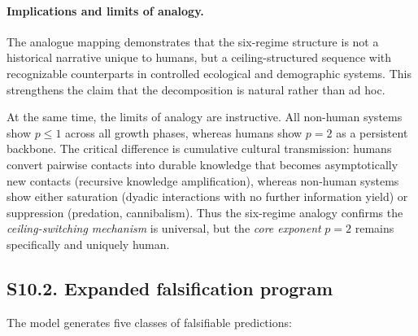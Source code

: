 \documentclass[11pt]{article}
\begin{document}
\paragraph{Implications and limits of analogy.}

The analogue mapping demonstrates that the six-regime structure is not a historical narrative unique to humans, but a
ceiling-structured sequence with recognizable counterparts in controlled ecological and demographic systems.
This strengthens the claim that the decomposition is natural rather than ad hoc.

At the same time, the limits of analogy are instructive. All non-human systems show $p \leq 1$ across all growth phases,
whereas humans show $p=2$ as a persistent backbone. The critical difference is cumulative cultural transmission: humans convert
pairwise contacts into durable knowledge that becomes asymptotically new contacts (recursive knowledge amplification), whereas
non-human systems show either saturation (dyadic interactions with no further information yield) or suppression (predation,
cannibalism). Thus the six-regime analogy confirms the \emph{ceiling-switching mechanism} is universal, but the \emph{core exponent}
$p=2$ remains specifically and uniquely human.

\subsection*{S10.2. Expanded falsification program}

The model generates five classes of falsifiable predictions:
\end{document}
